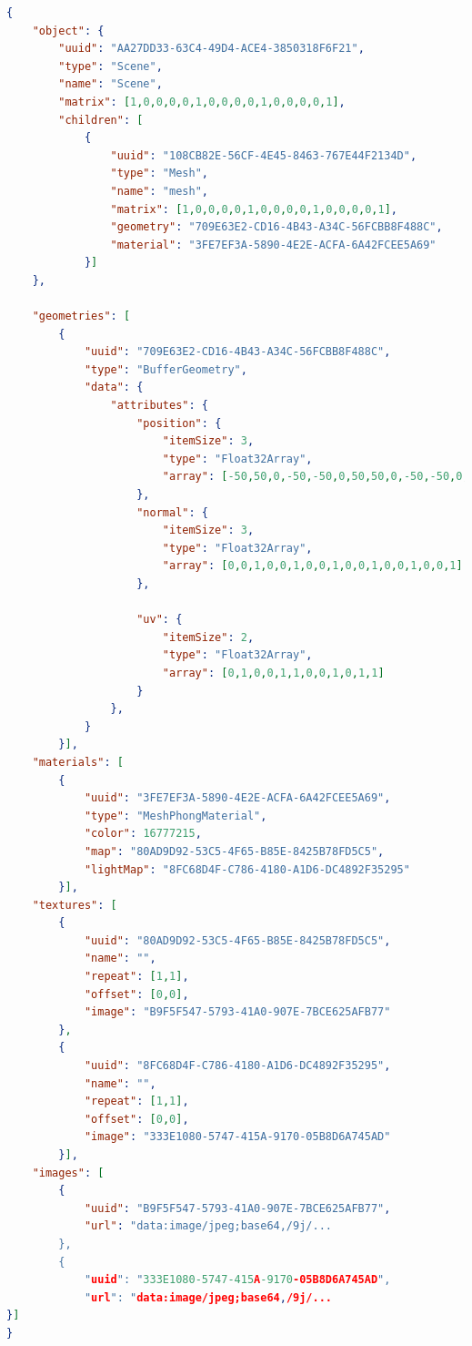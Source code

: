 \begin{lstlisting}[language=json]
{
    "object": {
        "uuid": "AA27DD33-63C4-49D4-ACE4-3850318F6F21",
        "type": "Scene",
        "name": "Scene",
        "matrix": [1,0,0,0,0,1,0,0,0,0,1,0,0,0,0,1],
        "children": [
            {
                "uuid": "108CB82E-56CF-4E45-8463-767E44F2134D",
                "type": "Mesh",
                "name": "mesh",
                "matrix": [1,0,0,0,0,1,0,0,0,0,1,0,0,0,0,1],
                "geometry": "709E63E2-CD16-4B43-A34C-56FCBB8F488C",
                "material": "3FE7EF3A-5890-4E2E-ACFA-6A42FCEE5A69"
            }]
    },

    "geometries": [
        {
            "uuid": "709E63E2-CD16-4B43-A34C-56FCBB8F488C",
            "type": "BufferGeometry",
            "data": {
                "attributes": {
                    "position": {
                        "itemSize": 3,
                        "type": "Float32Array",
                        "array": [-50,50,0,-50,-50,0,50,50,0,-50,-50,0,50,-50,0,50,50,0]
                    },
                    "normal": {
                        "itemSize": 3,
                        "type": "Float32Array",
                        "array": [0,0,1,0,0,1,0,0,1,0,0,1,0,0,1,0,0,1]
                    },

                    "uv": {
                        "itemSize": 2,
                        "type": "Float32Array",
                        "array": [0,1,0,0,1,1,0,0,1,0,1,1]
                    }
                },
            }
        }],
    "materials": [
        {
            "uuid": "3FE7EF3A-5890-4E2E-ACFA-6A42FCEE5A69",
            "type": "MeshPhongMaterial",
            "color": 16777215,
            "map": "80AD9D92-53C5-4F65-B85E-8425B78FD5C5",
            "lightMap": "8FC68D4F-C786-4180-A1D6-DC4892F35295"
        }],
    "textures": [
        {
            "uuid": "80AD9D92-53C5-4F65-B85E-8425B78FD5C5",
            "name": "",
            "repeat": [1,1],
            "offset": [0,0],
            "image": "B9F5F547-5793-41A0-907E-7BCE625AFB77"
        },
        {
            "uuid": "8FC68D4F-C786-4180-A1D6-DC4892F35295",
            "name": "",
            "repeat": [1,1],
            "offset": [0,0],
            "image": "333E1080-5747-415A-9170-05B8D6A745AD"
        }],
    "images": [
        {
            "uuid": "B9F5F547-5793-41A0-907E-7BCE625AFB77",
            "url": "data:image/jpeg;base64,/9j/...
        },
        {
            "uuid": "333E1080-5747-415A-9170-05B8D6A745AD",
            "url": "data:image/jpeg;base64,/9j/...    
}]
}
\end{lstlisting}


